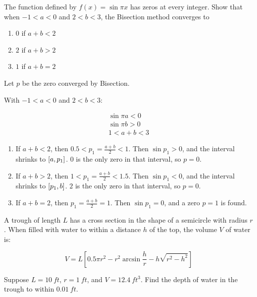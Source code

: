 \documentclass[../../Assignments.tex]{subfiles}
\begin{document}
\begin{exercise}
    The function defined by \(f(x) = \sin{\pi x}\) has zeros at every integer.
    Show that when \(−1 < a < 0\) and \(2 < b < 3\), the Bisection method
    converges to

    \begin{multicols}{3}
        \begin{enumerate}[label = (\alph*)]
            \item \(0\) if \(a + b < 2\)
            \item \(2\) if \(a + b > 2\)
            \item \(1\) if \(a + b = 2\)
        \end{enumerate}
    \end{multicols}
\end{exercise}

\begin{solution}
    Let \(p\) be the zero converged by Bisection.

    With \(-1 < a < 0\) and \(2 < b < 3\):

    \begin{gather*}
        \sin{\pi a} < 0 \\
        \sin{\pi b} > 0 \\
        1 < a + b < 3
    \end{gather*}

    \begin{enumerate}[label = (\alph*)]
        \item If \(a + b < 2\), then \(\num{0.5} < p_1 = \frac{a + b}{2} < 1\).
            Then \(\sin{p_1} > 0\), and the interval shrinks to
            \(\interval{a}{p_1}\). \(0\) is the only zero in that interval, so
            \(p = 0\).

        \item If \(a + b > 2\), then \(1 < p_1 = \frac{a + b}{2} < \num{1.5}\).
            Then \(\sin{p_1} < 0\), and the interval shrinks to
            \(\interval{p_1}{b}\). \(2\) is the only zero in that interval, so
            \(p = 0\).

        \item If \(a + b = 2\), then \(p_1 = \frac{a + b}{2} = 1\). Then
            \(\sin{p_1} = 0\), and a zero \(p = 1\) is found.
    \end{enumerate}
\end{solution}

\begin{exercise}
    A trough of length \(L\) has a cross section in the shape of a semicircle
    with radius \(r\). When filled with water to within a distance \(h\) of the
    top, the volume \(V\) of water is:

    \[V = L [0.5 \pi r^2 - r^2 \arcsin{\frac{h}{r}} - h \sqrt{r^2 - h^2}]\]

    Suppose \(L = \SI{10}{ft}\), \(r = \SI{1}{ft}\), and \(V =
    \SI{12.4}{ft^3}\). Find the depth of water in the trough to within
    \(\SI{0.01}{ft}\).
\end{exercise}
\end{document}
